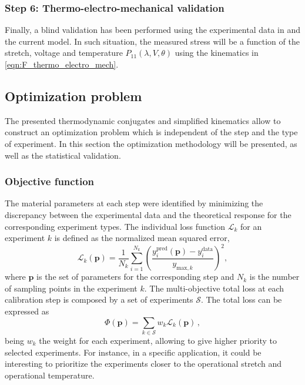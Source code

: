 \subsubsection{Step 6: Thermo-electro-mechanical validation}

Finally, a blind validation has been performed using the experimental data in \cite{Mehnert2021a} and the current model. In such situation, the measured stress will be a function of the stretch, voltage and temperature $P_{11}(\lambda,V,\theta)$ using the kinematics in \eqref{eqn:F_thermo_electro_mech}.



\subsection{Optimization problem}

The presented thermodynamic conjugates and simplified kinematics allow to construct an optimization problem which is independent of the step and the type of experiment. In this section the optimization methodology will be presented, as well as the statistical validation.


\subsubsection{Objective function}

The material parameters at each step were identified by minimizing the discrepancy between the experimental data and the theoretical response for the corresponding experiment types. The individual loss function $\mathcal{L}_k$ for an experiment $k$ is defined as the normalized mean squared error,
\begin{equation}
  \mathcal{L}_k(\mathbf{p}) = \frac{1}{N_k} \sum_{i=1}^{N_k} \left(
    \frac{y_i^\text{pred}(\mathbf{p}) - y_i^\text{data}}{y_{\text{max},k}}
  \right)^2 ,
\end{equation}
where $\mathbf{p}$ is the set of parameters for the corresponding step and $N_k$ is the number of sampling points in the experiment $k$. The multi-objective total loss at each calibration step is composed by a set of experiments $\mathcal{S}$. The total loss can be expressed as
\begin{equation}
  \Phi(\mathbf{p}) = \sum_{k\in\mathcal{S}} w_k \mathcal{L}_k(\mathbf{p}) \,,
\end{equation}
being $w_k$ the weight for each experiment, allowing to give higher priority to selected experiments. For instance, in a specific application, it could be interesting to prioritize the experiments closer to the operational stretch and operational temperature.



